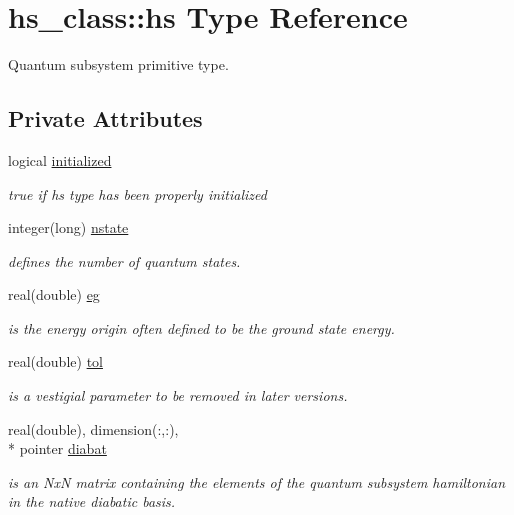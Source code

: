 \hypertarget{strucths__class_1_1hs}{\section{hs\+\_\+class\+:\+:hs Type Reference}
\label{strucths__class_1_1hs}
}


Quantum subsystem primitive type.  


\subsection*{Private Attributes}
\begin{DoxyCompactItemize}
\item 
logical \hyperlink{strucths__class_1_1hs_a39ff1ef8fc5a20f97973d4947d518c5f}{initialized}
\begin{DoxyCompactList}\small\item\em true if hs type has been properly initialized \end{DoxyCompactList}\item 
integer(long) \hyperlink{strucths__class_1_1hs_acb57246378a120bd330012dae9a3ff38}{nstate}
\begin{DoxyCompactList}\small\item\em defines the number of quantum states. \end{DoxyCompactList}\item 
real(double) \hyperlink{strucths__class_1_1hs_aa0f4d851a33f1d195d2b6b9334cdb5d5}{eg}
\begin{DoxyCompactList}\small\item\em is the energy origin often defined to be the ground state energy. \end{DoxyCompactList}\item 
real(double) \hyperlink{strucths__class_1_1hs_a45c5cb902e23547a231a25fcd34cc621}{tol}
\begin{DoxyCompactList}\small\item\em is a vestigial parameter to be removed in later versions. \end{DoxyCompactList}\item 
real(double), dimension(\+:,\+:), \\*
pointer \hyperlink{strucths__class_1_1hs_a18f6eb65a6edae047d41c8aa5a3d9d09}{diabat}
\begin{DoxyCompactList}\small\item\em is an Nx\+N matrix containing the elements of the quantum subsystem hamiltonian in the native diabatic basis. \end{DoxyCompactList}\item 

\end{DoxyCompactItemize}
